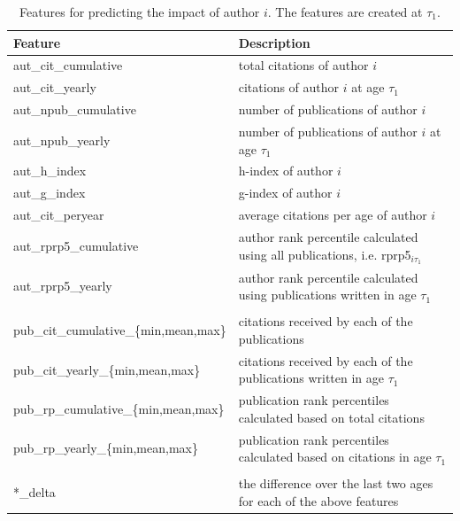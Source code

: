 \begin{refsection}
\begin{table}[htbp]
  \centering
    \begin{tabular}{l|l}
    Feature & Description \\
    \midrule
    aut\_cit\_cumulative & total citations of author $i$ \\
    aut\_cit\_yearly & citations of author $i$ at age $\tau_1$ \\
    aut\_npub\_cumulative & number of publications of author $i$ \\
    aut\_npub\_yearly & number of publications of author $i$ at age $\tau_1$ \\
    aut\_h\_index & h-index of author $i$ \\
    aut\_g\_index & g-index of author $i$ \\
    aut\_cit\_peryear & average citations per age of author $i$ \\
    aut\_rprp5\_cumulative & author rank percentile calculated using all publications, i.e. rprp5$_{i\tau_1}$ \\
    aut\_rprp5\_yearly & author rank percentile calculated using publications written in age $\tau_1$ \\
          &  \\
    pub\_cit\_cumulative\_\{min,mean,max\} & citations received by each of the publications \\
    pub\_cit\_yearly\_\{min,mean,max\} & citations received by each of the publications written in age $\tau_1$ \\
    pub\_rp\_cumulative\_\{min,mean,max\} & publication rank percentiles calculated based on total citations \\
    pub\_rp\_yearly\_\{min,mean,max\} & publication rank percentiles calculated based on citations in age $\tau_1$ \\
          &  \\
    *\_delta & the difference over the last two ages for each of the above features \\
    \end{tabular}%
  \caption{Features for predicting the impact of author $i$. The features are created at $\tau_1$.}
  \label{tab:features_autrp}%
\end{table}%


\end{refsection}
